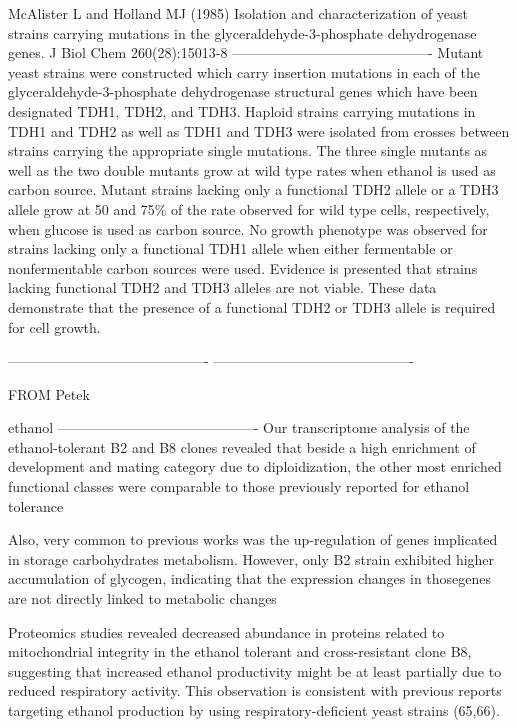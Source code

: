 McAlister L and Holland MJ (1985) Isolation and characterization of yeast strains carrying mutations in the glyceraldehyde-3-phosphate dehydrogenase genes. J Biol Chem 260(28):15013-8
-------------------------------------------
Mutant yeast strains were constructed which carry insertion mutations in each of the glyceraldehyde-3-phosphate dehydrogenase structural genes which have been designated TDH1, TDH2, and TDH3. Haploid strains carrying mutations in TDH1 and TDH2 as well as TDH1 and TDH3 were isolated from crosses between strains carrying the appropriate single mutations. The three single mutants as well as the two double mutants grow at wild type rates when ethanol is used as carbon source. Mutant strains lacking only a functional TDH2 allele or a TDH3 allele grow at 50 and 75\% of the rate observed for wild type cells, respectively, when glucose is used as carbon source. No growth phenotype was observed for strains lacking only a functional TDH1 allele when either fermentable or nonfermentable carbon sources were used. Evidence is presented that strains lacking functional TDH2 and TDH3 alleles are not viable. These data demonstrate that the presence of a functional TDH2 or TDH3 allele is required for cell growth.








-------------------------------------------
-------------------------------------------

FROM Petek


ethanol
-------------------------------------------
Our transcriptome analysis of the ethanol-tolerant B2 and B8
clones revealed that beside a high enrichment of development and
mating category due to diploidization, the other most enriched
functional classes were comparable to those previously reported
for ethanol tolerance

Also, very common to previous works was the up-regulation of genes implicated in storage carbohydrates metabolism. However, only B2 strain exhibited higher accumulation of glycogen, indicating that the expression changes in thosegenes are not directly linked to metabolic changes

Proteomics studies revealed decreased abundance in proteins related to mitochondrial integrity in the ethanol tolerant and cross-resistant clone B8, suggesting that increased ethanol productivity might be at least partially due to reduced respiratory activity. This observation is consistent with previous reports targeting ethanol production by using respiratory-deficient yeast strains (65,66).


